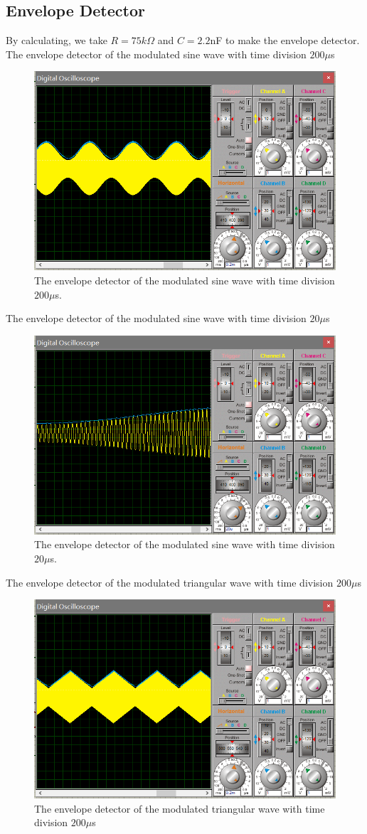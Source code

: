 \documentclass[a4paper]{article}
\begin{document}
\subsection{Envelope Detector}
By calculating, we take $R=75k\Omega$ and $C=2.2$nF to make the envelope detector.
The envelope detector of the modulated sine wave with time division $200\mu$s
\begin{figure}[H]
	\centering
	\includegraphics[width=0.8\linewidth]{20.png}
	\caption{The envelope detector of the modulated sine wave with time division $200\mu$s.}
\end{figure}
The envelope detector of the modulated sine wave with time division $20\mu$s
\begin{figure}[H]
	\centering
	\includegraphics[width=0.8\linewidth]{21.png}
	\caption{The envelope detector of the modulated sine wave with time division $20\mu$s.}
\end{figure}
The envelope detector of the modulated triangular wave with time division $200\mu$s
\begin{figure}[H]
	\centering
	\includegraphics[width=0.8\linewidth]{22.png}
	\caption{The envelope detector of the modulated triangular wave with time division $200\mu$s}
\end{figure}
\end{document}

